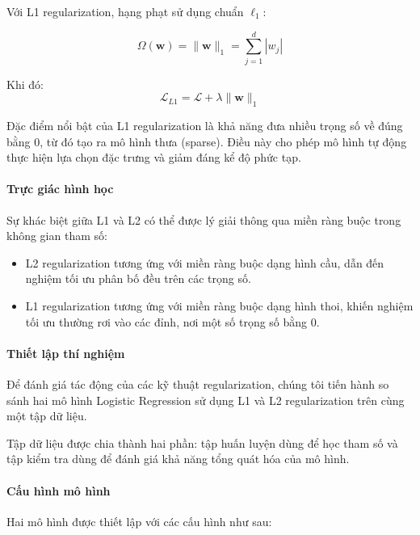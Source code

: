 Với L1 regularization, hạng phạt sử dụng chuẩn $\ell_1$:

\[
\Omega(\boldsymbol{w}) = \|\boldsymbol{w}\|_1 = \sum_{j=1}^{d} |w_j|
\]

Khi đó:
\[
\mathcal{L}_{L1} =
\mathcal{L} + \lambda \|\boldsymbol{w}\|_1
\]

Đặc điểm nổi bật của L1 regularization là khả năng đưa nhiều trọng số về đúng bằng 0, từ đó tạo ra mô hình thưa (sparse). Điều này cho phép mô hình tự động thực hiện lựa chọn đặc trưng và giảm đáng kể độ phức tạp.

\paragraph{Trực giác hình học}

Sự khác biệt giữa L1 và L2 có thể được lý giải thông qua miền ràng buộc trong không gian tham số:

\begin{itemize}
    \item L2 regularization tương ứng với miền ràng buộc dạng hình cầu, dẫn đến nghiệm tối ưu phân bố đều trên các trọng số.
    \item L1 regularization tương ứng với miền ràng buộc dạng hình thoi, khiến nghiệm tối ưu thường rơi vào các đỉnh, nơi một số trọng số bằng 0.
\end{itemize}

\paragraph{Thiết lập thí nghiệm}

Để đánh giá tác động của các kỹ thuật regularization, chúng tôi tiến hành so sánh hai mô hình Logistic Regression sử dụng L1 và L2 regularization trên cùng một tập dữ liệu.

Tập dữ liệu được chia thành hai phần: tập huấn luyện dùng để học tham số và tập kiểm tra dùng để đánh giá khả năng tổng quát hóa của mô hình.

\paragraph{Cấu hình mô hình}

Hai mô hình được thiết lập với các cấu hình như sau:

